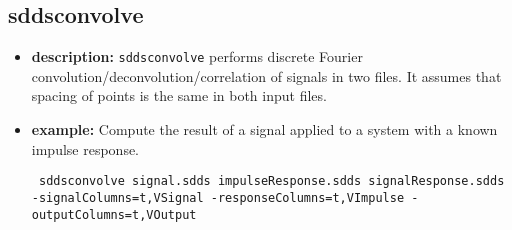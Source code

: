 \begin{latexonly}
\newpage
\end{latexonly}
\subsection{sddsconvolve}
\label{sddsconvolve}

\begin{itemize}
\item {\bf description:} 
{\tt sddsconvolve} performs discrete Fourier convolution/deconvolution/correlation of
signals in two files.  It assumes that spacing of points is the same in both input files.
\item {\bf example:}
Compute the result of a signal applied to a system with a known impulse response.
\begin{flushleft}{\tt
sddsconvolve signal.sdds impulseResponse.sdds signalResponse.sdds
-signalColumns=t,VSignal -responseColumns=t,VImpulse -outputColumns=t,VOutput
}\end{flushleft}


\end{itemize}
